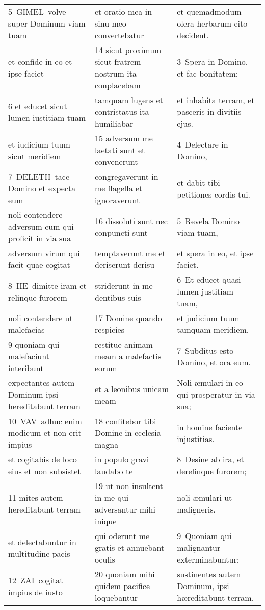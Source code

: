 \documentclass{article}
\begin{document}
\begin{longtable}{@{}p{}p{}p{}@{}}
5 GIMEL volve super Dominum viam tuam	&	et oratio mea in sinu meo convertebatur	&	et quemadmodum olera herbarum cito decident.	\\
et confide in eo et ipse faciet	&	14 sicut proximum sicut fratrem nostrum ita conplacebam	&	3 Spera in Domino, et fac bonitatem;	\\
6 et educet sicut lumen iustitiam tuam	&	tamquam lugens et contristatus ita humiliabar	&	et inhabita terram, et pasceris in divitiis ejus.	\\
et iudicium tuum sicut meridiem	&	15 adversum me laetati sunt et convenerunt	&	4 Delectare in Domino,	\\
7 DELETH tace Domino et expecta eum	&	congregaverunt in me flagella et ignoraverunt	&	et dabit tibi petitiones cordis tui.	\\
noli contendere adversum eum qui proficit in via sua	&	16 dissoluti sunt nec conpuncti sunt	&	5 Revela Domino viam tuam,	\\
adversum virum qui facit quae cogitat	&	temptaverunt me et deriserunt derisu	&	et spera in eo, et ipse faciet.	\\
8 HE dimitte iram et relinque furorem	&	striderunt in me dentibus suis	&	6 Et educet quasi lumen justitiam tuam,	\\
noli contendere ut malefacias	&	17 Domine quando respicies	&	et judicium tuum tamquam meridiem.	\\
9 quoniam qui malefaciunt interibunt	&	restitue animam meam a malefactis eorum	&	7 Subditus esto Domino, et ora eum.	\\
expectantes autem Dominum ipsi hereditabunt terram	&	et a leonibus unicam meam	&	Noli æmulari in eo qui prosperatur in via sua;	\\
10 VAV adhuc enim modicum et non erit impius	&	18 confitebor tibi Domine in ecclesia magna	&	in homine faciente injustitias.	\\
et cogitabis de loco eius et non subsistet	&	in populo gravi laudabo te	&	8 Desine ab ira, et derelinque furorem;	\\
11 mites autem hereditabunt terram	&	19 ut non insultent in me qui adversantur mihi inique	&	noli æmulari ut maligneris.	\\
et delectabuntur in multitudine pacis	&	qui oderunt me gratis et annuebant oculis	&	9 Quoniam qui malignantur exterminabuntur;	\\
12 ZAI cogitat impius de iusto	&	20 quoniam mihi quidem pacifice loquebantur	&	sustinentes autem Dominum, ipsi hæreditabunt terram.	\\

\end{longtable}
\end{document}
